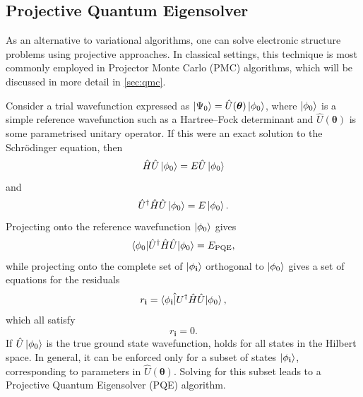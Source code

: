 \documentclass[%
 reprint,
 amsmath,amssymb,
 aps,
]{revtex4-2}
\begin{document}
\subsection{Projective Quantum Eigensolver}
As an alternative to variational algorithms, one can solve electronic structure problems using projective approaches. In classical settings, this technique is most commonly employed in Projector Monte Carlo (PMC) algorithms, which will be discussed in more detail in \cref{sec:qmc}.

Consider a trial wavefunction expressed as \mbox{$\ket{\Psi_0} =\hat U (\boldsymbol\theta)\ket{\phi_0}$}, where $\ket{\phi_0}$ is a simple reference wavefunction such as a Hartree--Fock determinant and $\hat U(\mathbf{\boldsymbol\theta})$ is some parametrised unitary operator.
If this were an exact solution to the Schr\"odinger equation, then
\begin{equation}
\hat H \hat U \ket{\phi_0} = E \hat U\ket{\phi_0}
\end{equation}
and
\begin{equation}
\hat U^\dagger \hat H \hat U \ket{\phi_0} = E \ket{\phi_0}.
\label{eq:linked}
\end{equation}
Projecting  onto the reference wavefunction $\ket{\phi_0}$ gives
\begin{equation}
    \braket{\phi_0|\hat U^\dagger \hat H \hat U |\phi_0} = E_\mathrm{PQE},
    \label{eq:epqe}
\end{equation}
while projecting onto the complete set of $\ket{\phi_\mathbf{i}}$ orthogonal to $\ket{\phi_0}$ gives a set of equations for the residuals
\begin{equation}
 r_\mathbf{i} = \braket{\phi_\mathbf{i}\hat| U^\dagger \hat H \hat U |\phi_0},
\end{equation}
which all satisfy
\begin{equation}
    r_\mathbf{i} = 0.
     \label{eq:resid}
\end{equation}
If $\hat U\ket{\phi_0}$ is the true ground state wavefunction,  holds for all states in the Hilbert space. In general, it can be enforced only for a subset of states $\ket{\phi_\mathbf{i}}$, corresponding to parameters in $\hat U(\boldsymbol \theta)$.  Solving  for this subset leads to a Projective Quantum Eigensolver (PQE)\cite{Stair2021} algorithm.
\end{document}
